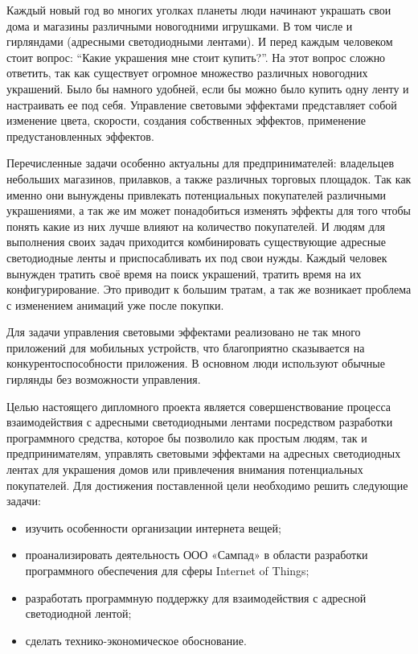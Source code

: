 \label{sec:introduction}

Каждый новый год во многих уголках планеты люди начинают украшать свои дома и магазины различными новогодними игрушками. В том числе и гирляндами (адресными светодиодными лентами). И перед каждым человеком стоит вопрос: \enquote{Какие украшения мне стоит купить?}. На этот вопрос сложно ответить, так как существует огромное множество различных новогодних украшений. Было бы намного удобней, если бы можно было купить одну ленту и настраивать ее под себя. Управление световыми эффектами представляет собой изменение цвета, скорости, создания собственных эффектов, применение предустановленных эффектов.

Перечисленные задачи особенно актуальны для предпринимателей: владельцев небольших магазинов, прилавков, а также различных торговых площадок. Так как именно они вынуждены привлекать потенциальных покупателей различными украшениями, а так же им может понадобиться изменять эффекты для того чтобы понять какие из них лучше влияют на количество покупателей. И людям для выполнения своих задач приходится комбинировать существующие адресные светодиодные ленты и приспосабливать их под свои нужды. Каждый человек вынужден тратить своё время на поиск украшений, тратить время на их конфигурирование. Это приводит к большим тратам, а так же возникает проблема с изменением анимаций уже после покупки.

Для задачи управления световыми эффектами реализовано не так много приложений для мобильных устройств, что благоприятно сказывается на конкурентоспособности приложения. В основном люди используют обычные гирлянды без возможности управления.

Целью настоящего дипломного проекта является совершенствование процесса взаимодействия с адресными светодиодными лентами посредством разработки программного средства, которое бы позволило как простым людям, так и предпринимателям, управлять световыми эффектами на адресных светодиодных лентах для украшения домов или привлечения внимания потенциальных покупателей. Для достижения поставленной цели необходимо решить следующие задачи:
\begin{itemize}
\item изучить особенности организации интернета вещей;
\item проанализировать деятельность ООО «Сампад» в области разработки программного обеспечения для сферы Internet of Things;
\item разработать программную поддержку для взаимодействия с адресной светодиодной лентой;
\item сделать технико-экономическое обоснование.
\end{itemize}